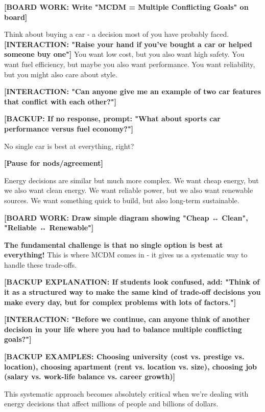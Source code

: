 \documentclass[12pt]{article}
\begin{document}
\textcolor{speakernote}{\textbf{[BOARD WORK: Write "MCDM = Multiple Conflicting Goals" on board]}}

Think about buying a car - a decision most of you have probably faced. \textcolor{speakernote}{\textbf{[INTERACTION: "Raise your hand if you've bought a car or helped someone buy one"]}} You want low cost, but you also want high safety. You want fuel efficiency, but maybe you also want performance. You want reliability, but you might also care about style.

\textcolor{speakernote}{\textbf{[INTERACTION: "Can anyone give me an example of two car features that conflict with each other?"]}}

\textcolor{speakernote}{\textbf{[BACKUP: If no response, prompt: "What about sports car performance versus fuel economy?"]}}

No single car is best at everything, right?

\textcolor{speakernote}{\textbf{[Pause for nods/agreement]}}

Energy decisions are similar but much more complex. We want cheap energy, but we also want clean energy. We want reliable power, but we also want renewable sources. We want something quick to build, but also long-term sustainable.

\textcolor{speakernote}{\textbf{[BOARD WORK: Draw simple diagram showing "Cheap ↔ Clean", "Reliable ↔ Renewable"]}}

\textcolor{emphasis}{\textbf{The fundamental challenge is that no single option is best at everything!}} This is where MCDM comes in - it gives us a systematic way to handle these trade-offs.

\textcolor{speakernote}{\textbf{[BACKUP EXPLANATION: If students look confused, add: "Think of it as a structured way to make the same kind of trade-off decisions you make every day, but for complex problems with lots of factors."]}}

\textcolor{speakernote}{\textbf{[INTERACTION: "Before we continue, can anyone think of another decision in your life where you had to balance multiple conflicting goals?"]}}

\textcolor{speakernote}{\textbf{[BACKUP EXAMPLES: Choosing university (cost vs. prestige vs. location), choosing apartment (rent vs. location vs. size), choosing job (salary vs. work-life balance vs. career growth)]}}

This systematic approach becomes absolutely critical when we're dealing with energy decisions that affect millions of people and billions of dollars.
\end{document}
